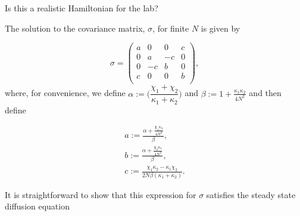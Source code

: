 \documentclass[11pt,a4paper]{article}
\numberwithin{equation}{section}
\begin{document}
	\color{blue}Is this a realistic Hamiltonian for the lab?\color{black}
	
	The solution to the covariance matrix, $\sigma$, for finite $N$ is given by 
	
	\begin{equation} \label{eq:44}
	\sigma = \begin{pmatrix}
	a & 0 & 0 & c\\
	0 & a & -c & 0\\
	0 & -c & b & 0 \\
	c & 0 & 0 & b\\
	\end{pmatrix},
	\end{equation}	
	where, for convenience, we define $\alpha := \Big(\dfrac{\chi_1 + \chi_2}{\kappa_1 + \kappa_2}\Big)$ and $\beta := 1 + \frac{\kappa_1 \kappa_2}{4N^2}$ and then define
	
	
	\begin{align*}
	&a := \frac{\alpha + \frac{\chi_1 \kappa_2}{4N^2}}{\beta},&\\
	&b := \frac{\alpha + \frac{\chi_2 \kappa_1}{4N^2}}{\beta},&\\
	&c := \frac{\chi_1 \kappa_2 - \kappa_1 \chi_2}{2N\beta (\kappa_1+\kappa_2)}.&		
	\end{align*}


	It is straightforward to show that this expression for $\sigma$ satisfies the steady state diffusion equation
\end{document}
